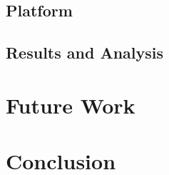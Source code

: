 \documentclass[times, 10pt,twocolumn]{article}
\begin{document}
\subsection{Platform}

\subsection{Results and Analysis}


\section{Future Work}

\section{Conclusion}




\end{document}
